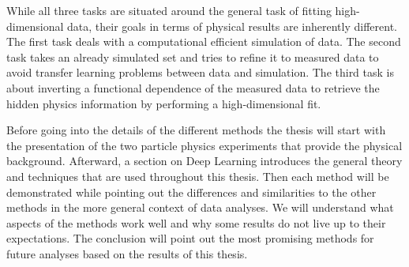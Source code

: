 While all three tasks are situated around the general task of fitting high-dimensional data, their goals in terms of physical results are inherently different. The first task deals with a computational efficient simulation of data. The second task takes an already simulated set and tries to refine it to measured data to avoid transfer learning problems between data and simulation. The third task is about inverting a functional dependence of the measured data to retrieve the hidden physics information by performing a high-dimensional fit.

Before going into the details of the different methods the thesis will start with the presentation of the two particle physics experiments that provide the physical background. Afterward, a section on Deep Learning introduces the general theory and techniques that are used throughout this thesis. Then each method will be demonstrated while pointing out the differences and similarities to the other methods in the more general context of data analyses. We will understand what aspects of the methods work well and why some results do not live up to their expectations. The conclusion will point out the most promising methods for future analyses based on the results of this thesis.
